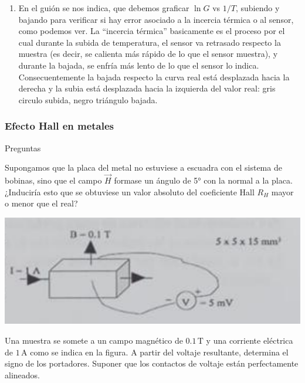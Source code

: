 \begin{enumerate}[label=\alph*)]
	\item En el guión se nos indica, que debemos graficar $\ln G$ vs $1/T$, subiendo y bajando para verificar si hay error asociado a la incercia  térmica o al sensor, como podemos ver. La ``incercia  térmica'' basicamente es el proceso por el cual durante la subida de temperatura, el sensor va retrasado respecto la muestra (es decir, se calienta más rápido de lo que el sensor muestra), y durante la bajada, se enfría más lento de lo que el sensor lo indica. Consecuentemente la bajada respecto la curva real está desplazada hacia la derecha y la subia está desplazada hacia la izquierda del valor real: gris circulo subida, negro triángulo bajada. 
\end{enumerate}

\vspace*{2em}

\begin{Enunciado}
	\subsubsection{Efecto Hall en metales}
	Preguntas
	\begin{enumerate}[label=\alph*)]
		\begin{minipage}{0.5\linewidth}
			\item Supongamos que la placa del metal no estuviese a escuadra con el sistema de bobinas, sino que el campo \( \vec{H} \) formase un ángulo de 5° con la normal a la placa. ¿Induciría esto que se obtuviese un valor absoluto del coeficiente Hall \( R_H \) mayor o menor que el real?

		\end{minipage}\hfill\begin{minipage}{0.45\linewidth}
			\includegraphics[width=0.9\linewidth]{Cuerpo/Ch_02/Examen_24_8.png}
		\end{minipage}
		\item Una muestra se somete a un campo magnético de \( 0.1\,\text{T} \) y una corriente eléctrica de \( 1\,\text{A} \) como se indica en la figura. A partir del voltaje resultante, determina el signo de los portadores. Suponer que los contactos de voltaje están perfectamente alineados.
	\end{enumerate}
\end{Enunciado}

